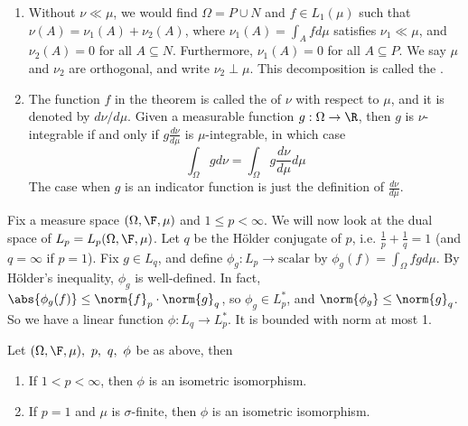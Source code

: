 \documentclass[a4paper]{article}
\begin{document}
\begin{remark}
	\begin{enumerate}[label=(\arabic*)]
		\item Without $\nu\ll\mu$, we would find $\Omega=P\cup N$ and $f\in L_1(\mu)$ such that $\nu(A)=\nu_1(A)+\nu_2(A)$, where $\nu_1(A)=\int_A f d\mu$ satisfies $\nu_1\ll\mu$, and $\nu_2(A)=0$ for all $A\subseteq N$. Furthermore, $\nu_1(A)=0$ for all $A\subseteq P$. We say $\mu$ and $\nu_2$ are orthogonal, and write $\nu_2\perp\mu$. This decomposition is called the .
		\item The function $f$ in the theorem is called the  of $\nu$ with respect to $\mu$, and it is denoted by $d\nu/d\mu$. Given a measurable function $g:\Omega\to\R$, then $g$ is $\nu$-integrable if and only if $g\frac{d\nu}{d\mu}$ is $\mu$-integrable, in which case
		\[
		 \int_\Omega g d\nu=\int_\Omega g\frac{d\nu}{d\mu}d\mu
		\]
		The case when $g$ is an indicator function is just the definition of $\frac{d\nu}{d\mu}$.
	\end{enumerate}
\end{remark}

Fix a measure space $(\Omega,\F,\mu)$ and $1\leq p<\infty$. We will now look at the dual space of $L_p=L_p(\Omega,\F,\mu)$. Let $q$ be the H\"older conjugate of $p$, i.e. $\frac{1}{p}+\frac{1}{q}=1$ (and $q=\infty$ if $p=1$). Fix $g\in L_q$, and define $\phi_g:L_p\to\text{scalar}$ by $\phi_g(f)=\int_\Omega fg d\mu$. By H\"older's inequality, $\phi_g$ is well-defined. In fact, $\abs{\phi_g(f)}\leq\norm{f}_p\cdot\norm{g}_q$, so $\phi_g\in L_p^*$, and $\norm{\phi_g}\leq\norm{g}_q$. So we have a linear function $\phi:L_q\to L_p^*$. It is bounded with norm at most 1.

\begin{nthm}\label{thm:DualLp}
  Let $(\Omega,\F,\mu),\ p,\ q,\ \phi$ be as above, then
  \begin{enumerate}[label=(\roman*)]
	 \item If $1<p<\infty$, then $\phi$ is an isometric isomorphism.
  	\item If $p=1$ and $\mu$ is $\sigma$-finite, then $\phi$ is an isometric isomorphism.
  \end{enumerate}
\end{nthm}
\end{document}
